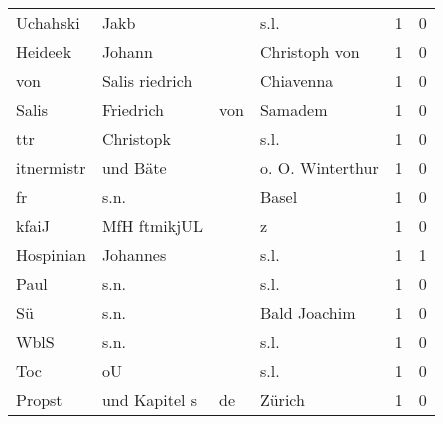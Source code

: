 \begin{center}
\begin{tiny}
\begin{longtabu}{llllrr}
                 Uchahski &                               Jakb &             &                                        s.l. &          1 &         0 \\
                  Heideek &                             Johann &             &                               Christoph von &          1 &         0 \\
                      von &                     Salis riedrich &             &                                   Chiavenna &          1 &         0 \\
                    Salis &                          Friedrich &         von &                                     Samadem &          1 &         0 \\
                      ttr &                          Christopk &             &                                        s.l. &          1 &         0 \\
               itnermistr &                           und Bäte &             &                            o. O. Winterthur &          1 &         0 \\
                       fr &                               s.n. &             &                                       Basel &          1 &         0 \\
                    kfaiJ &                       MfH ftmikjUL &             &                                           z &          1 &         0 \\
                Hospinian &                           Johannes &             &                                        s.l. &          1 &         1 \\
                     Paul &                               s.n. &             &                                        s.l. &          1 &         0 \\
                       Sü &                               s.n. &             &                                Bald Joachim &          1 &         0 \\
                     WblS &                               s.n. &             &                                        s.l. &          1 &         0 \\
                      Toc &                                 oU &             &                                        s.l. &          1 &         0 \\
                   Propst &                      und Kapitel s &          de &                                      Zürich &          1 &         0 \\

\end{longtabu}
\end{tiny}
\end{center}
